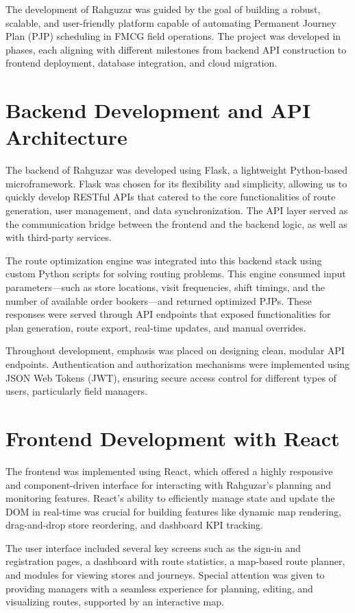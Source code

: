 The development of Rahguzar was guided by the goal of building a robust, scalable, and user-friendly platform capable of automating Permanent Journey Plan (PJP) scheduling in FMCG field operations. The project was developed in phases, each aligning with different milestones from backend API construction to frontend deployment, database integration, and cloud migration.

\section{Backend Development and API Architecture}
The backend of Rahguzar was developed using Flask, a lightweight Python-based microframework. Flask was chosen for its flexibility and simplicity, allowing us to quickly develop RESTful APIs that catered to the core functionalities of route generation, user management, and data synchronization. The API layer served as the communication bridge between the frontend and the backend logic, as well as with third-party services.

The route optimization engine was integrated into this backend stack using custom Python scripts for solving routing problems. This engine consumed input parameters—such as store locations, visit frequencies, shift timings, and the number of available order bookers—and returned optimized PJPs. These responses were served through API endpoints that exposed functionalities for plan generation, route export, real-time updates, and manual overrides.

Throughout development, emphasis was placed on designing clean, modular API endpoints. Authentication and authorization mechanisms were implemented using JSON Web Tokens (JWT), ensuring secure access control for different types of users, particularly field managers.

\section{Frontend Development with React}
The frontend was implemented using React, which offered a highly responsive and component-driven interface for interacting with Rahguzar's planning and monitoring features. React’s ability to efficiently manage state and update the DOM in real-time was crucial for building features like dynamic map rendering, drag-and-drop store reordering, and dashboard KPI tracking.

The user interface included several key screens such as the sign-in and registration pages, a dashboard with route statistics, a map-based route planner, and modules for viewing stores and journeys. Special attention was given to providing managers with a seamless experience for planning, editing, and visualizing routes, supported by an interactive map.

